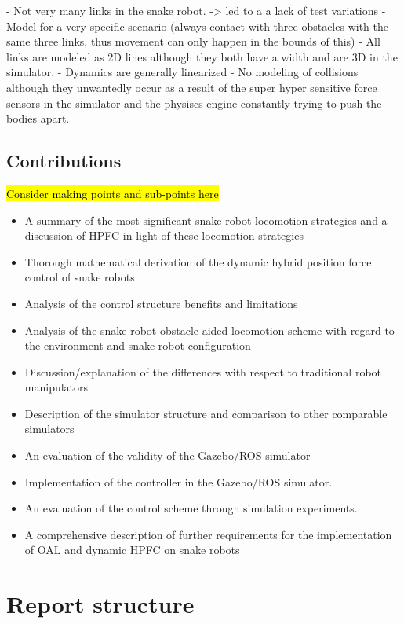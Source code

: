 - Not very many links in the snake robot. -> led to a a lack of test variations
- Model for a very specific scenario (always contact with three obstacles with the same three links, thus movement can only happen in the bounds of this)
- All links are modeled as 2D lines although they both have a width and are 3D in the simulator.
- Dynamics are generally linearized
- No modeling of collisions although they unwantedly occur as a result of the super hyper sensitive force sensors in the simulator and the physiscs engine constantly trying to push the bodies apart.

\subsection{Contributions}

\hl{Consider making points and sub-points here}

\begin{itemize}
    \item A summary of the most significant snake robot locomotion strategies and a discussion of HPFC in light of these locomotion strategies
    \item Thorough mathematical derivation of the dynamic hybrid position force control of snake robots
    \item Analysis of the control structure benefits and limitations
    \item Analysis of the snake robot obstacle aided locomotion scheme with regard to the environment and snake robot configuration
    \item Discussion/explanation of the differences with respect to traditional robot manipulators
    \item Description of the simulator structure and comparison to other comparable simulators
    \item An evaluation of the validity of the Gazebo/ROS simulator
    \item Implementation of the controller in the Gazebo/ROS simulator.
    \item An evaluation of the control scheme through simulation experiments.
    \item A comprehensive description of further requirements for the implementation of OAL and dynamic HPFC on snake robots 
\end{itemize}


\section{Report structure}